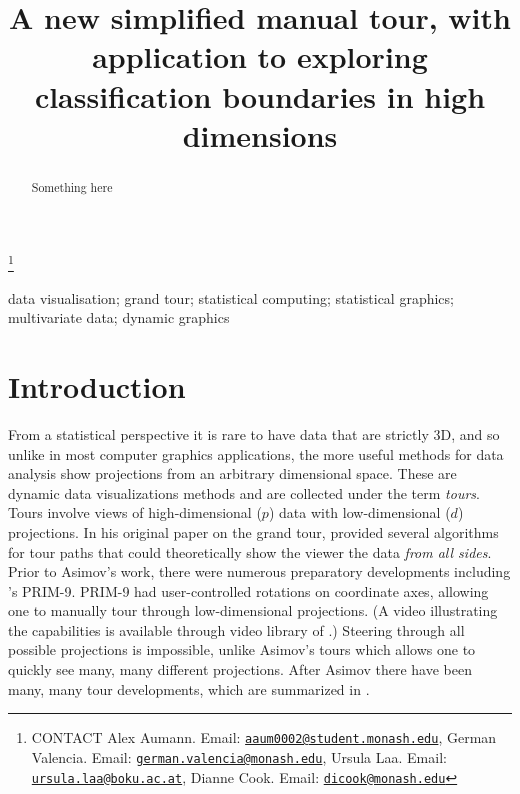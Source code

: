 \documentclass[]{interact}
\theoremstyle{plain}%
\theoremstyle{definition}
\theoremstyle{remark}
\begin{document}

\title{A new simplified manual tour, with application to exploring
classification boundaries in high dimensions}


\author{
}

\thanks{CONTACT Alex
Aumann. Email: \href{mailto:aaum0002@student.monash.edu}{\nolinkurl{aaum0002@student.monash.edu}}, German
Valencia. Email: \href{mailto:german.valencia@monash.edu}{\nolinkurl{german.valencia@monash.edu}}, Ursula
Laa. Email: \href{mailto:ursula.laa@boku.ac.at}{\nolinkurl{ursula.laa@boku.ac.at}}, Dianne
Cook. Email: \href{mailto:dicook@monash.edu}{\nolinkurl{dicook@monash.edu}}}

\maketitle

\begin{abstract}
Something here
\end{abstract}

\begin{keywords}
data visualisation; grand tour; statistical computing; statistical
graphics; multivariate data; dynamic graphics
\end{keywords}

\hypertarget{introduction}{%
\section{Introduction}\label{introduction}}

From a statistical perspective it is rare to have data that are strictly
3D, and so unlike in most computer graphics applications, the more
useful methods for data analysis show projections from an arbitrary
dimensional space. These are dynamic data visualizations methods and are
collected under the term \emph{tours}. Tours involve views of
high-dimensional (\(p\)) data with low-dimensional (\(d\)) projections.
In his original paper on the grand tour, \citet{As85} provided several
algorithms for tour paths that could theoretically show the viewer the
data \emph{from all sides}. Prior to Asimov's work, there were numerous
preparatory developments including \citet{tukey}'s PRIM-9. PRIM-9 had
user-controlled rotations on coordinate axes, allowing one to manually
tour through low-dimensional projections. (A video illustrating the
capabilities is available through video library of \citet{ASA22}.)
Steering through all possible projections is impossible, unlike Asimov's
tours which allows one to quickly see many, many different projections.
After Asimov there have been many, many tour developments, which are
summarized in \citet{lee2021}.
\end{document}
